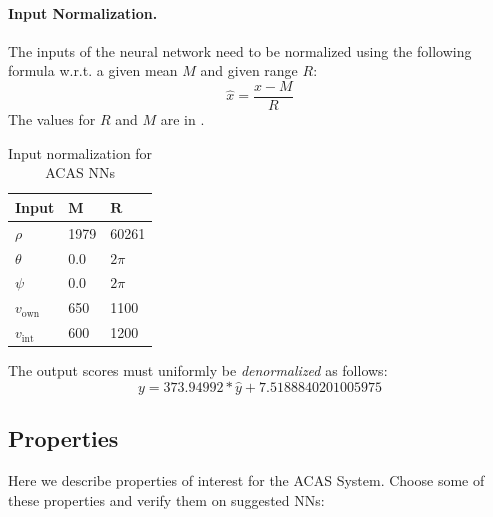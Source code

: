 \documentclass[11pt,fleqn]{article}
\begin{document}
\paragraph*{Input Normalization.}
The inputs of the neural network need to be normalized using the following formula w.r.t. a given mean $M$ and given range $R$:
\[
\hat{x} = \frac{x - M}{R}
\]
The values for $R$ and $M$ are in .
\begin{table}[h]
\caption{Input normalization for ACAS NNs}
\centering
\begin{tabular}{l|l|l}
    \textbf{Input} & $\mathbf{M}$ & $\mathbf{R}$\\\hline
    $\rho$ & 1979 & 60261\\
    $\theta$ & 0.0 & $2\pi$\\
    $\psi$ & 0.0 & $2\pi$\\
    $v_{\text{own}}$ &  650 & 1100\\
    $v_{\text{int}}$ &  600 & 1200\\
\end{tabular}
\label{tab:acas_normalization}
\end{table}


The output scores must uniformly be \emph{denormalized} as follows:
\[
y = 373.94992*\hat{y}+7.5188840201005975
\]

\subsection*{Properties}
Here we describe properties of interest for the ACAS System.
Choose some of these properties and verify them on suggested NNs:



\end{document}
